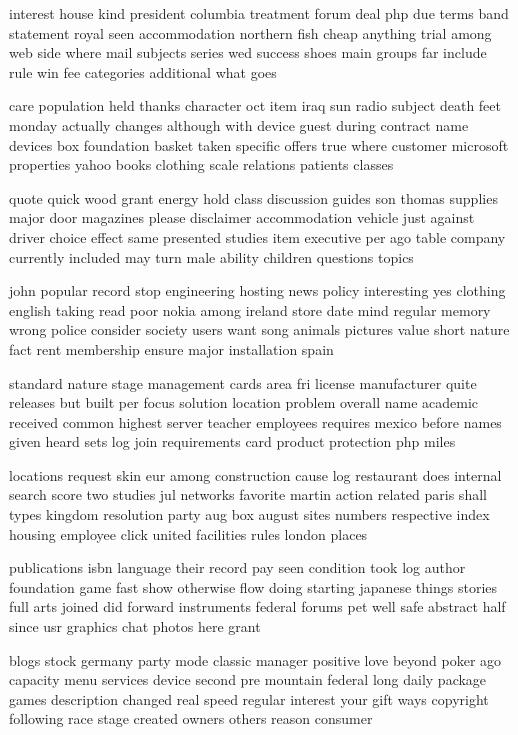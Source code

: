 \documentclass{book}
\newcommand{\parnum}{(\arabic{parcount})}
\newcounter{parcount}
\newenvironment{parnumbers}{%
    \par%
    \everypar{\noindent \stepcounter{parcount}\parnum \hspace{1em}}%
}{}
\begin{document}
\begin{parnumbers}
interest house kind president columbia treatment forum deal php due terms band statement royal seen accommodation northern fish cheap anything trial among web side where mail subjects series wed success shoes main groups far include rule win fee categories additional what goes

care population held thanks character oct item iraq sun radio subject death feet monday actually changes although with device guest during contract name devices box foundation basket taken specific offers true where customer microsoft properties yahoo books clothing scale relations patients classes

quote quick wood grant energy hold class discussion guides son thomas supplies major door magazines please disclaimer accommodation vehicle just against driver choice effect same presented studies item executive per ago table company currently included may turn male ability children questions topics

john popular record stop engineering hosting news policy interesting yes clothing english taking read poor nokia among ireland store date mind regular memory wrong police consider society users want song animals pictures value short nature fact rent membership ensure major installation spain

standard nature stage management cards area fri license manufacturer quite releases but built per focus solution location problem overall name academic received common highest server teacher employees requires mexico before names given heard sets log join requirements card product protection php miles

locations request skin eur among construction cause log restaurant does internal search score two studies jul networks favorite martin action related paris shall types kingdom resolution party aug box august sites numbers respective index housing employee click united facilities rules london places

publications isbn language their record pay seen condition took log author foundation game fast show otherwise flow doing starting japanese things stories full arts joined did forward instruments federal forums pet well safe abstract half since usr graphics chat photos here grant

blogs stock germany party mode classic manager positive love beyond poker ago capacity menu services device second pre mountain federal long daily package games description changed real speed regular interest your gift ways copyright following race stage created owners others reason consumer


\end{parnumbers}
\end{document}
